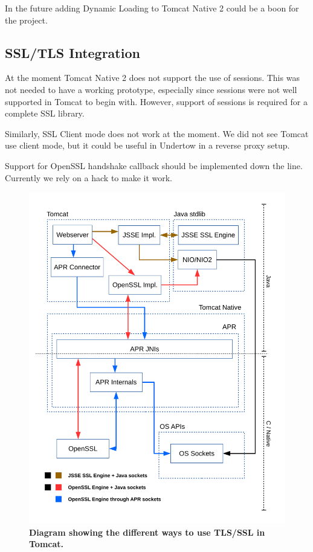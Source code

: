 \documentclass[11pt,a4paper,bibliography=totocnumbered]{scrartcl}
\def\mytitle{Tomcat Native 2}
\begin{document}
In the future adding Dynamic Loading to \mytitle{} could be a boon for the project.

\subsection{SSL/TLS Integration}
At the moment \mytitle{} does not support the use of sessions. This was not needed to have a working prototype, especially since sessions were not well supported in Tomcat to begin with. However, support of sessions is required for a complete SSL library.

Similarly, SSL Client mode does not work at the moment. We did not see Tomcat use client mode, but it could be useful in Undertow in a reverse proxy setup.

Support for OpenSSL handshake callback should be implemented down the line. Currently we rely on a hack to make it work.
\newpage
\printbibliography

\begin{figure}[!h]
	\begin{center}
		\includegraphics[scale=0.7]{diagram_current_way.pdf}
	\end{center}
	\caption{\textbf{Diagram showing the different ways to use TLS/SSL in Tomcat.}}
	\label{fig:current}
\end{figure}
\end{document}
